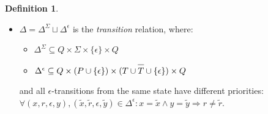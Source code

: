 \documentclass{article}
\newcommand{\Xin}{\!\in\!}
\newcommand{\Xeq}{\!=\!}
\newcommand*{\Xbar}[1]{\overline{#1\vphantom{\bar{#1}}}}
\theoremstyle{definition}
\newtheorem{Xdef}{Definition}
\begin{document}
\begin{multicols}{2}
\begin{Xdef}
\begin{itemize}
        \item[] $\Delta \Xeq \Delta^\Sigma \sqcup \Delta^\epsilon$ is the \emph{transition} relation, where:
        \begin{itemize}
            \item[] $\Delta^\Sigma \subseteq Q \times \Sigma \times \{\epsilon\} \times Q$
            \item[] $\Delta^\epsilon \subseteq Q \times (P \cup \{\epsilon\}) \times (T \cup \Xbar{T} \cup \{\epsilon\}) \times Q$
        \end{itemize}
        and all $\epsilon$-transitions from the same state have different priorities:
        $\forall (x, r, \epsilon, y), (\widetilde{x}, \widetilde{r}, \epsilon, \widetilde{y}) \Xin \Delta^\epsilon:
        x \Xeq \widetilde{x} \wedge y \Xeq \widetilde{y} \Rightarrow r \!\neq\! \widetilde{r}$.
    \end{itemize}
    \end{Xdef}


\end{multicols}
\end{document}
